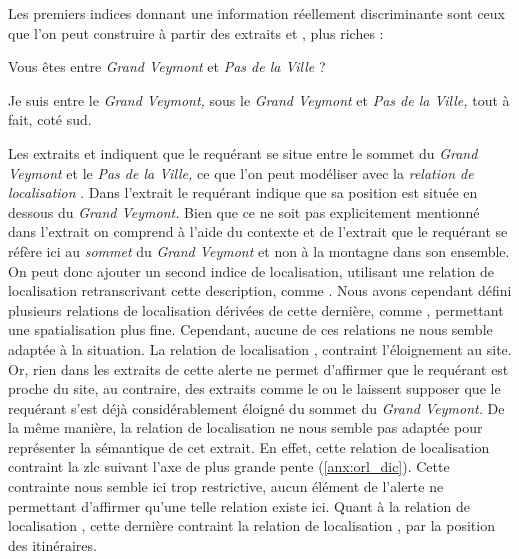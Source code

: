 Les premiers indices donnant une information réellement discriminante
sont ceux que l'on peut construire à partir des extraits  et
, plus riches :
%
\begin{dialogue}
  \Sec {} Vous êtes entre \emph{Grand Veymont} et \emph{Pas de
la Ville} ?

  \Req {} Je suis entre le \emph{Grand Veymont,}  sous
le \emph{Grand Veymont} et \emph{Pas de la Ville,} tout à fait,
 coté sud.
\end{dialogue}
% 
Les extraits  et  indiquent que le requérant se
situe entre le sommet du \emph{Grand Veymont} et le \emph{Pas de la
  Ville,} ce que l'on peut modéliser avec la \emph{relation de
  localisation} .
%
Dans l'extrait  le requérant indique que sa position est
située en dessous du \emph{Grand Veymont.} Bien que ce ne soit pas
explicitement mentionné dans l'extrait on comprend à l'aide du
contexte et de l'extrait  que le requérant se réfère ici au
\emph{sommet} du \emph{Grand Veymont} et non à la montagne dans son
ensemble. On peut donc ajouter un second indice de localisation,
utilisant une relation de localisation retranscrivant cette
description, comme . Nous avons cependant
défini plusieurs relations de localisation dérivées de cette dernière,
comme , permettant une spatialisation plus
fine. Cependant, aucune de ces relations ne nous semble adaptée à la
situation. La relation de localisation ,
contraint l'éloignement au site. Or, rien dans les extraits de cette
alerte ne permet d'affirmer que le requérant est proche du site, au
contraire, des extraits comme le  ou le  laissent
supposer que le requérant s'est déjà considérablement éloigné du
sommet du \emph{Grand Veymont.} De la même manière, la relation de
localisation  ne nous semble pas
adaptée pour représenter la sémantique de cet extrait. En effet, cette
relation de localisation contraint la \ac{zlc} suivant l'axe de plus
grande pente (\autoref{anx:orl_dic}). Cette contrainte nous semble ici
trop restrictive, aucun élément de l'alerte ne permettant d'affirmer
qu'une telle relation existe ici. Quant à la relation de localisation
, cette dernière contraint la
relation de localisation , par la position
des itinéraires.

